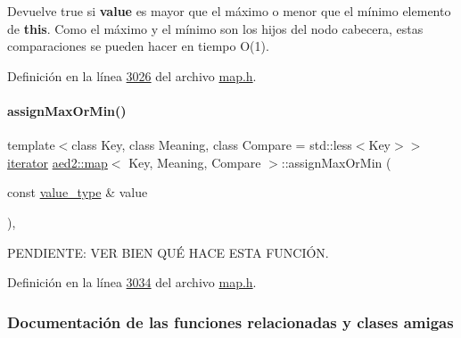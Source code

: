Devuelve true si {\bfseries value} es mayor que el máximo o menor que el mínimo elemento de {\bfseries this}. Como el máximo y el mínimo son los hijos del nodo cabecera, estas comparaciones se pueden hacer en tiempo O(1). 



Definición en la línea \hyperlink{map_8h_source_l03026}{3026} del archivo \hyperlink{map_8h_source}{map.\+h}.

\mbox{\label{classaed2_1_1map_a50aae07014200a53b95394f349f55948_a50aae07014200a53b95394f349f55948}} 
\paragraph{\texorpdfstring{assign\+Max\+Or\+Min()}{assignMaxOrMin()}}
{\footnotesize\ttfamily template$<$class Key, class Meaning, class Compare = std\+::less$<$\+Key$>$$>$ \\
\hyperlink{classaed2_1_1map_1_1iterator}{iterator} \hyperlink{classaed2_1_1map}{aed2\+::map}$<$ Key, Meaning, Compare $>$\+::assign\+Max\+Or\+Min (\begin{DoxyParamCaption}\item[{const \hyperlink{classaed2_1_1map_a719db98e0ff9a837610f76be33264680_a719db98e0ff9a837610f76be33264680}{value\+\_\+type} \&}]{value }\end{DoxyParamCaption})\hspace{0.3cm}{\ttfamily [inline]}, {\ttfamily [private]}}



P\+E\+N\+D\+I\+E\+N\+TE\+: V\+ER B\+I\+EN Q\+UÉ H\+A\+CE E\+S\+TA F\+U\+N\+C\+IÓN. 



Definición en la línea \hyperlink{map_8h_source_l03034}{3034} del archivo \hyperlink{map_8h_source}{map.\+h}.



\subsubsection{Documentación de las funciones relacionadas y clases amigas}
\mbox{\label{classaed2_1_1map_abfc51b39670220e79037ac067006e933_abfc51b39670220e79037ac067006e933}} 
